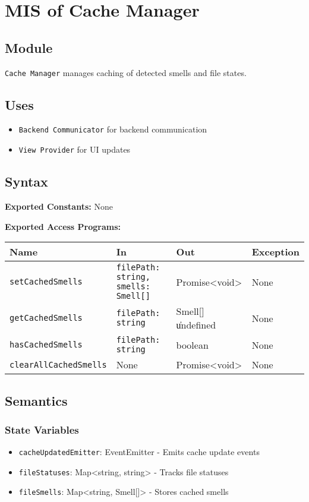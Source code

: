 \documentclass[12pt, titlepage]{article}
\begin{document}
\section{MIS of Cache Manager}

\subsection{Module}
\texttt{Cache Manager} manages caching of detected smells and file states.

\subsection{Uses}
\begin{itemize}
\item \texttt{Backend Communicator} for backend communication
\item \texttt{View Provider} for UI updates
\end{itemize}

\subsection{Syntax}

\textbf{Exported Constants:} None

\textbf{Exported Access Programs:}\\
\begin{tabularx}{\linewidth}{|l|>{\raggedright\arraybackslash}X|l|l|}
  \hline
  \textbf{Name} & \textbf{In} & \textbf{Out} & \textbf{Exception} \\
  \hline
  \texttt{setCachedSmells} & \texttt{filePath: string, smells: Smell[]} & Promise<void> & None \\ \hline
  \texttt{getCachedSmells} & \texttt{filePath: string} & Smell[] \| undefined & None \\ \hline
  \texttt{hasCachedSmells} & \texttt{filePath: string} & boolean & None \\ \hline
  \texttt{clearAllCachedSmells} & None & Promise<void> & None \\
  \hline
\end{tabularx}

\subsection{Semantics}

\subsubsection{State Variables}
\begin{itemize}
\item \texttt{cacheUpdatedEmitter}: EventEmitter - Emits cache update events
\item \texttt{fileStatuses}: Map<string, string> - Tracks file statuses
\item \texttt{fileSmells}: Map<string, Smell[]> - Stores cached smells
\end{itemize}
\end{document}
